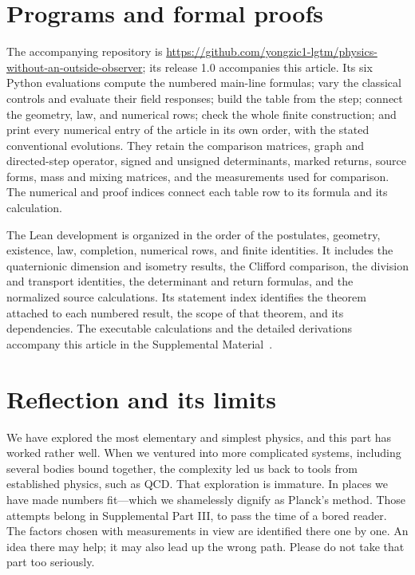 \documentclass[aps,prx,reprint,longbibliography]{revtex4-2}
\providecommand{\SI}{Supplemental Material}
\begin{document}
\section{Programs and formal proofs}
\label{app:code}

The accompanying repository is \url{https://github.com/yongzic1-lgtm/physics-without-an-outside-observer}; its release 1.0 accompanies this article. Its six Python evaluations compute the numbered main-line formulas; vary the classical controls and evaluate their field responses; build the table from the step; connect the geometry, law, and numerical rows; check the whole finite construction; and print every numerical entry of the article in its own order, with the stated conventional evolutions. They retain the comparison matrices, graph and directed-step operator, signed and unsigned determinants, marked returns, source forms, mass and mixing matrices, and the measurements used for comparison. The numerical and proof indices connect each table row to its formula and its calculation.

The Lean development is organized in the order of the postulates, geometry, existence, law, completion, numerical rows, and finite identities. It includes the quaternionic dimension and isometry results, the Clifford comparison, the division and transport identities, the determinant and return formulas, and the normalized source calculations. Its statement index identifies the theorem attached to each numbered result, the scope of that theorem, and its dependencies. The executable calculations and the detailed derivations accompany this article in the \SI~\cite{SI}.

\section{Reflection and its limits}
\label{app:reflection}

We have explored the most elementary and simplest physics, and this part has worked rather well. When we ventured into more complicated systems, including several bodies bound together, the complexity led us back to tools from established physics, such as QCD. That exploration is immature. In places we have made numbers fit---which we shamelessly dignify as Planck's method. Those attempts belong in Supplemental Part III, to pass the time of a bored reader. The factors chosen with measurements in view are identified there one by one. An idea there may help; it may also lead up the wrong path. Please do not take that part too seriously.
\end{document}
